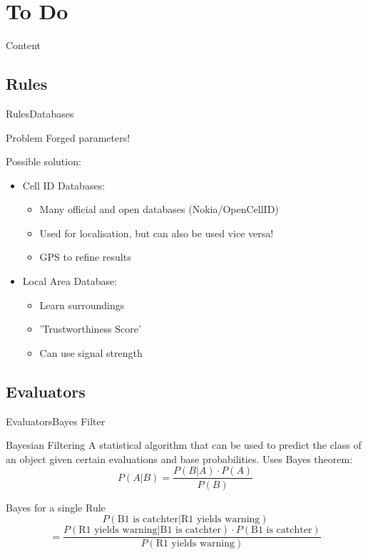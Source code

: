 \documentclass{beamer}
\newcommand{\tocsection}[1]{
  \section{#1}
  \begin{frame}{Content}
    \tableofcontents[sectionstyle=show/shaded,subsectionstyle=show/show/hide]
  \end{frame}
 }
\begin{document}
\tocsection{To Do}
\subsection{Rules}
\begin{frame}{Rules}{Databases}
\begin{alertblock}{Problem}
Forged parameters!
\end{alertblock}
Possible solution:
\begin{itemize}
	\item Cell ID Databases:
	\begin{itemize}
		\item Many official and open databases (Nokia/OpenCellID)
		\item Used for localisation, but can also be used vice versa!
		\item GPS to refine results
	\end{itemize}
	\item Local Area Database:
	\begin{itemize}
		\item Learn surroundings
		\item 'Trustworthiness Score'
		\item Can use signal strength
	\end{itemize}
\end{itemize}
\end{frame}

\subsection{Evaluators}
\begin{frame}{Evaluators}{Bayes Filter}
\begin{block}{Bayesian Filtering}
A statistical algorithm that can be used to predict the class of an object given certain evaluations and base probabilities.
Uses Bayes theorem:
\[P(A\vert B)= \frac{P(B\vert A) \cdot P(A)}{P(B)}\]
\end{block}

\begin{exampleblock}{Bayes for a single Rule}
\[P(\text{B1 is catchter}\vert \text{R1 yields warning})\] 
\[=\frac{P(\text{R1 yields warning}\vert \text{B1 is catchter}) \cdot P(\text{B1 is catchter})}{P(\text{R1 yields warning})}\]
\end{exampleblock}
\end{frame}
\end{document}
